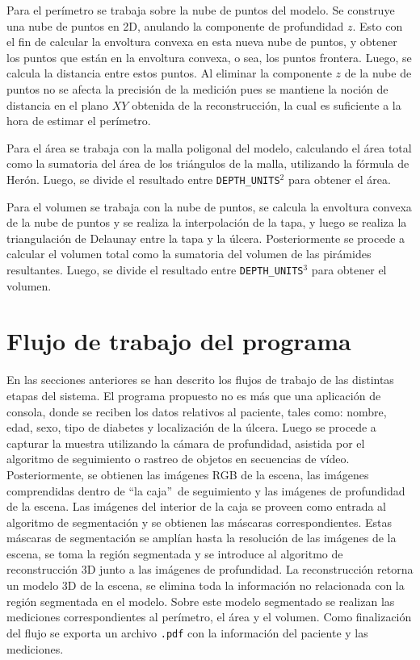 {Para el perímetro se trabaja sobre la nube de puntos del modelo. Se construye una nube de puntos en 2D, anulando la componente de profundidad $z$. Esto con el fin de calcular la envoltura convexa en esta nueva nube de puntos, y obtener los puntos que están en la envoltura convexa, o sea, los puntos frontera. Luego, se calcula la distancia entre estos puntos. Al eliminar la componente $z$ de la nube de puntos no se afecta la precisión de la medición pues se mantiene la noción de distancia en el plano $XY$ obtenida de la reconstrucción, la cual es suficiente a la hora de estimar el perímetro.  

Para el área se trabaja con la malla poligonal del modelo, calculando el área total como la sumatoria del área de los triángulos de la malla, utilizando la fórmula de Herón. Luego, se divide el resultado entre \texttt{DEPTH\_UNITS}$^2$ para obtener el área.

Para el volumen se trabaja con la nube de puntos, se calcula la envoltura convexa de la nube de puntos y se realiza la interpolación de la tapa, y luego se realiza la triangulación de Delaunay entre la tapa y la úlcera. Posteriormente se procede a calcular el volumen total como la sumatoria del volumen de las pirámides resultantes. Luego, se divide el resultado entre \texttt{DEPTH\_UNITS}$^3$ para obtener el volumen. 


\section{Flujo de trabajo del programa}

En las secciones anteriores se han descrito los flujos de trabajo de las distintas etapas del sistema. El programa propuesto no es más que una aplicación de consola, donde se reciben los datos relativos al paciente, tales como: nombre, edad, sexo, tipo de diabetes y localización de la úlcera. Luego se procede a capturar la muestra utilizando la cámara de profundidad, asistida por el algoritmo de seguimiento o rastreo de objetos en secuencias de vídeo. Posteriormente, se obtienen las imágenes RGB de la escena, las imágenes comprendidas dentro de \textquotedblleft la caja\textquotedblright\ de seguimiento y las imágenes de profundidad de la escena. Las imágenes del interior de la caja se proveen como entrada al algoritmo de segmentación y se obtienen las máscaras correspondientes. Estas máscaras de segmentación se amplían hasta la resolución de las imágenes de la escena, se toma la región segmentada y se introduce al algoritmo de reconstrucción 3D junto a las imágenes de profundidad. La reconstrucción retorna un modelo 3D de la escena, se elimina toda la información no relacionada con la región segmentada en el modelo. Sobre este modelo segmentado se realizan las mediciones correspondientes al perímetro, el área y el volumen. Como finalización del flujo se exporta un archivo \verb|.pdf| con la información del paciente y las mediciones. 

}
